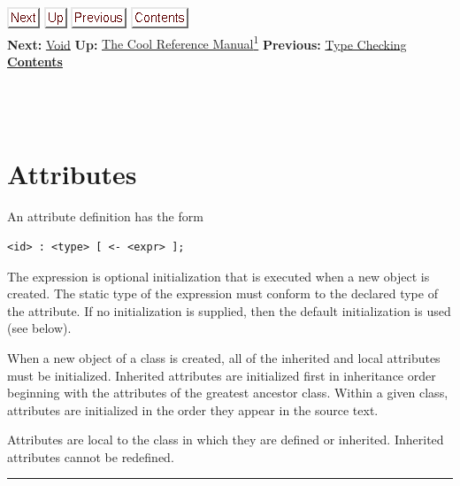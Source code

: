 \documentclass[]{article}
\begin{document}
\href{node11.html}{\includegraphics{next.png}}
\href{cool-manual.html}{\includegraphics{up.png}}
\href{node9.html}{\includegraphics{prev.png}}
\href{node1.html}{\includegraphics{contents.png}} \\ \textbf{Next:}
\href{node11.html}{Void} \textbf{Up:} \href{cool-manual.html}{The Cool
Reference Manual\textsuperscript{1}} \textbf{Previous:}
\href{node9.html}{Type Checking} ~ \textbf{\href{node1.html}{Contents}}
\\ \\

\section{\\ Attributes}

An attribute definition has the form

\begin{verbatim}
<id> : <type> [ <- <expr> ];
\end{verbatim}

The expression is optional initialization that is executed when a new
object is created. The static type of the expression must conform to the
declared type of the attribute. If no initialization is supplied, then
the default initialization is used (see below).

When a new object of a class is created, all of the inherited and local
attributes must be initialized. Inherited attributes are initialized
first in inheritance order beginning with the attributes of the greatest
ancestor class. Within a given class, attributes are initialized in the
order they appear in the source text.

Attributes are local to the class in which they are defined or
inherited. Inherited attributes cannot be redefined.

\begin{center}\rule{3in}{0.4pt}\end{center}
\end{document}
